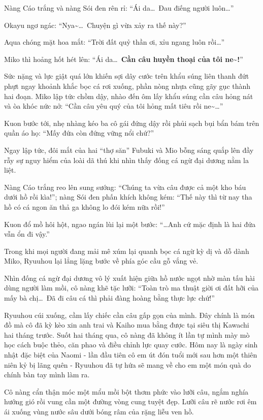 \documentclass[../main.tex]{subfiles}
\begin{document}
Nàng Cáo trắng và nàng Sói đen rên rỉ: ``Ái da\dots\ Đau điếng người luôn\dots''

Okayu ngơ ngác: ``Nya\~{}\dots\ Chuyện gì vừa xảy ra thế này?''

Aqua chóng mặt hoa mắt: ``Trời đất quỷ thần ơi, xỉu ngang luôn rồi\dots''

Miko thì hoảng hốt hét lên: ``Ái da\dots\ \textbf{Cần câu huyền thoại của tôi ne\~{}!}''

Sức nặng và lực giật quá lớn khiến sợi dây cước trên khẩu súng liên thanh đứt phựt ngay khoảnh khắc bọc cá rơi xuống, phần nòng nhựa cũng gãy gục thành hai đoạn. Miko lập tức chồm dậy, nhào đến ôm lấy khẩu súng cần câu hỏng nát và òa khóc nức nở: ``Cần câu yêu quý của tôi hỏng mất tiêu rồi ne\~{}\dots''

Kuon bước tới, nhẹ nhàng kéo ba cô gái đứng dậy rồi phủi sạch bụi bẩn bám trên quần áo họ: ``Mấy đứa còn đứng vững nổi chứ?''

Ngay lập tức, đôi mắt của hai ``thợ săn'' Fubuki và Mio bỗng sáng quắp lên đầy rẫy sự nguy hiểm của loài dã thú khi nhìn thấy đống cá ngừ đại dương nằm la liệt.

Nàng Cáo trắng reo lên sung sướng: ``Chúng ta vừa câu được cả một kho báu dưới hồ rồi kìa!''; nàng Sói đen phấn khích không kém: ``Thế này thì từ nay tha hồ có cá ngon ăn thả ga không lo đói kém nữa rồi!''

Kuon đổ mồ hôi hột, ngao ngán lùi lại một bước: ``\dots Anh cứ mặc định là hai đứa vẫn ổn đi vậy.''

\ct

Trong khi mọi người đang mải mê xúm lại quanh bọc cá ngừ kỳ dị và dỗ dành Miko, Ryuuhou lại lẳng lặng bước về phía góc cầu gỗ vắng vẻ.

Nhìn đống cá ngừ đại dương vô lý xuất hiện giữa hồ nước ngọt nhờ màn tấu hài dùng người làm mồi, cô nàng khẽ tặc lưỡi: ``Toàn trò ma thuật giời ơi đất hỡi của mấy bà chị\dots\ Đã đi câu cá thì phải đàng hoàng bằng thực lực chứ!''

Ryuuhou cúi xuống, cầm lấy chiếc cần câu gấp gọn của mình. Đây chính là món đồ mà cô đã kỳ kèo xin anh trai và Kaiho mua bằng được tại siêu thị Kawachi hai tháng trước. Suốt hai tháng qua, cô nàng đã không ít lần tự mình mày mò học cách buộc thẻo, căn phao và điều chỉnh lực quay cước. Hôm nay là ngày sinh nhật đặc biệt của Naomi - lần đầu tiên cô em út đón tuổi mới sau hơn một thiên niên kỷ bị lãng quên - Ryuuhou đã tự hứa sẽ mang về cho em một món quà do chính bàn tay mình làm ra.

Cô nàng cẩn thận móc một mẩu mồi bột thơm phức vào lưỡi câu, ngắm nghía hướng gió rồi vung cần một đường vòng cung tuyệt đẹp. Lưỡi câu rẽ nước rơi êm ái xuống vùng nước sâu dưới bóng râm của rặng liễu ven hồ.
\end{document}
